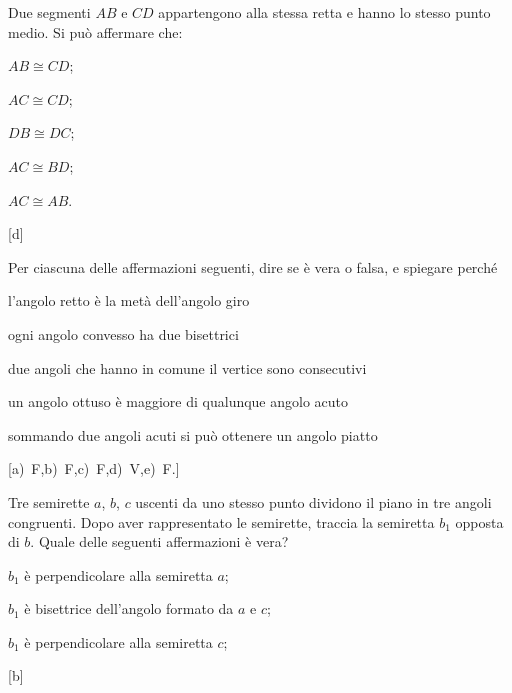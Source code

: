 \begin{esercizio}
\label{ese:1.72}
Due segmenti $AB$ e $CD$ appartengono alla stessa retta e hanno lo 
stesso punto medio. Si può affermare che:
\vspace{-.5em}
\begin{multicols}{5}
\begin{enumeratea}
\item $AB\cong CD$;
\item $AC\cong CD$;
\item $DB\cong DC$;
\item $AC\cong BD$;
\item $AC\cong AB$.
\end{enumeratea}
\end{multicols}
\vspace{-18pt}
\hfill[d]
\end{esercizio}

\begin{esercizio}
\label{ese:1.73}
Per ciascuna delle affermazioni seguenti, dire se è vera o falsa, e 
spiegare perché
\begin{enumeratea}
\item l'angolo retto è la metà dell'angolo giro
\hfill \boxV\quad\boxF
\item ogni angolo convesso ha due bisettrici
\hfill \boxV\quad\boxF
\item due angoli che hanno in comune il vertice sono consecutivi
\hfill \boxV\quad\boxF
\item un angolo ottuso è maggiore di qualunque angolo acuto
\hfill \boxV\quad\boxF
\item sommando due angoli acuti si può ottenere un angolo piatto
\hfill \boxV\quad\boxF
\end{enumeratea}
\vspace{-.5em}
\hfill[a)~F,\quad b)~F,\quad c)~F,\quad d)~V,\quad e)~F.]
\end{esercizio}

\begin{esercizio}
\label{ese:1.74}
Tre semirette $a$, $b$, $c$ uscenti da uno stesso punto dividono il 
piano in tre angoli congruenti. Dopo aver rappresentato le semirette, 
traccia la semiretta $b_1$ opposta di $b$. Quale delle seguenti 
affermazioni è vera?
\begin{enumeratea}
\item $b_1$ è perpendicolare alla semiretta $a$;
\item $b_1$ è bisettrice dell'angolo formato da $a$ e $c$;
\item $b_1$ è perpendicolare alla semiretta $c$;
\end{enumeratea}
\vspace{-18pt}
\hfill[b]
\end{esercizio}

